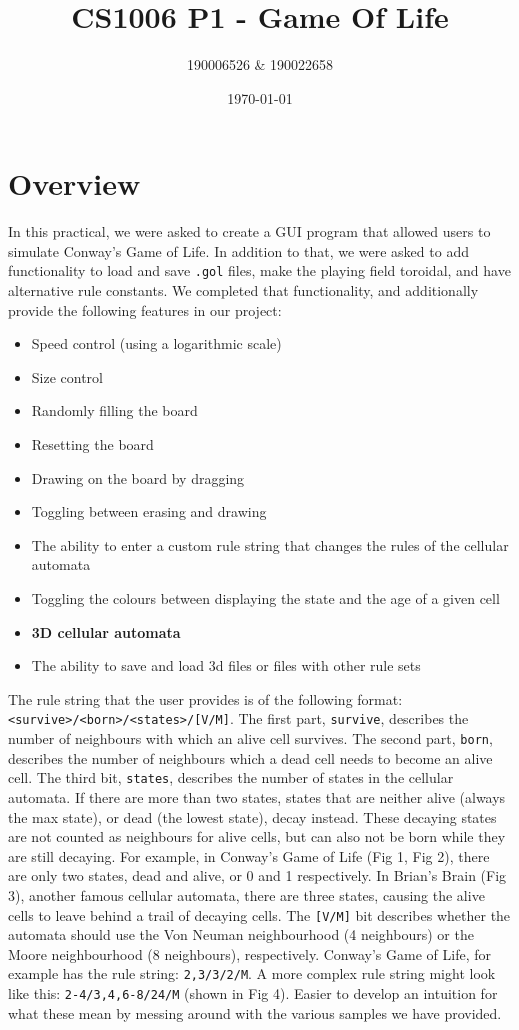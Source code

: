 \documentclass[11pt]{article}
\author{190006526 \& 190022658}
\date{\today}
\title{CS1006 P1 - Game Of Life}
\begin{document}
\maketitle
\setlength\parindent{0pt}
\thispagestyle{fancy}

\section{Overview}
\label{sec:orga5cd91c}
In this practical, we were asked to create a GUI program that allowed users to
simulate Conway's Game of Life.  In addition to that, we were asked to add
functionality to load and save \texttt{.gol} files, make the playing field toroidal, and
have alternative rule constants.  We completed that functionality, and
additionally provide the following features in our project:
\begin{itemize}
\item Speed control (using a logarithmic scale)
\item Size control
\item Randomly filling the board
\item Resetting the board
\item Drawing on the board by dragging
\item Toggling between erasing and drawing
\item The ability to enter a custom rule string that changes the rules of the
cellular automata
\item Toggling the colours between displaying the state and the age of a given cell
\item \textbf{3D cellular automata}
\item The ability to save and load 3d files or files with other rule sets
\end{itemize}

The rule string that the user provides is of the following format:
\texttt{<survive>/<born>/<states>/[V/M]}.  The first part, \texttt{survive}, describes the
number of neighbours with which an alive cell survives.  The second part,
\texttt{born}, describes the number of neighbours which a dead cell needs to become an
alive cell.  The third bit, \texttt{states}, describes the number of states in the
cellular automata.  If there are more than two states, states that are neither
alive (always the max state), or dead (the lowest state), decay instead.
These decaying states are not counted as neighbours for alive cells, but can
also not be born while they are still decaying.  For example, in Conway's Game
of Life (Fig 1, Fig 2), there are only two states, dead and alive, or 0 and 1 respectively.
In Brian's Brain (Fig 3), another famous cellular automata, there are three states,
causing the alive cells to leave behind a trail of decaying cells.  The \texttt{[V/M]}
bit describes whether the automata should use the Von Neuman neighbourhood (4
neighbours) or the Moore neighbourhood (8 neighbours), respectively.  Conway's
Game of Life, for example has the rule string: \texttt{2,3/3/2/M}.  A more complex rule
string might look like this: \texttt{2-4/3,4,6-8/24/M} (shown in Fig 4).  Easier to
develop an intuition for what these mean by messing around with the various
samples we have provided.\\
\end{document}
